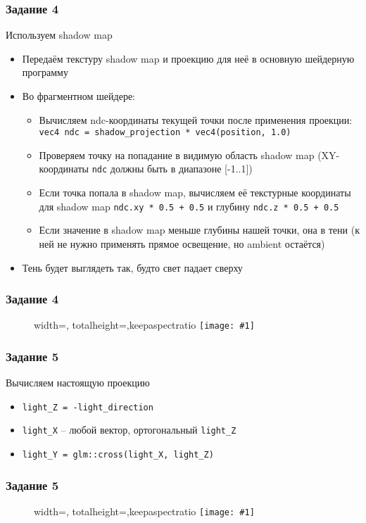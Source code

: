 \documentclass{beamer}
\newcommand{\slideimage}[1]{
  \begin{figure}
    \begin{adjustbox}{width=\textwidth, totalheight=\textheight-2\baselineskip-2\baselineskip,keepaspectratio}
      \texttt{[image: \#1]}
    \end{adjustbox}
  \end{figure}
}
\begin{document}
\begin{frame}[fragile]
\frametitle{Задание 4}
\fontsize{10pt}{10pt}
Используем shadow map
\begin{itemize}
\item Передаём текстуру shadow map и проекцию для неё в основную шейдерную программу
\item Во фрагментном шейдере:
\begin{itemize}
\item Вычисляем ndc-координаты текущей точки после применения проекции: \verb|vec4 ndc = shadow_projection * vec4(position, 1.0)|
\item Проверяем точку на попадание в видимую область shadow map (XY-координаты \verb|ndc| должны быть в диапазоне [-1..1])
\item Если точка попала в shadow map, вычисляем её текстурные координаты для shadow map \verb|ndc.xy * 0.5 + 0.5| и глубину \verb|ndc.z * 0.5 + 0.5|
\item Если значение в shadow map меньше глубины нашей точки, она в тени (к ней не нужно применять прямое освещение, но ambient остаётся)
\end{itemize}
\item Тень будет выглядеть так, будто свет падает сверху
\end{itemize}
\end{frame}

\begin{frame}[fragile]
\frametitle{Задание 4}
\slideimage{4.png}
\end{frame}

\begin{frame}[fragile]
\frametitle{Задание 5}
\fontsize{10pt}{10pt}
Вычисляем настоящую проекцию
\begin{itemize}
\item \verb|light_Z = -light_direction|
\item \verb|light_X| -- любой вектор, ортогональный \verb|light_Z|
\item \verb|light_Y = glm::cross(light_X, light_Z)|
\end{itemize}
\end{frame}

\begin{frame}[fragile]
\frametitle{Задание 5}
\slideimage{5.png}
\end{frame}
\end{document}
